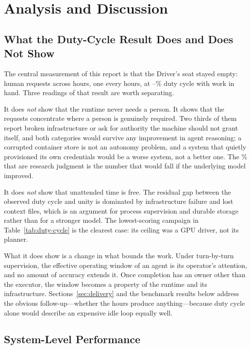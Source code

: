 \section{Analysis and Discussion}
\label{sec:discussion}

\subsection{What the Duty-Cycle Result Does and Does Not Show}

The central measurement of this report is that the Driver's seat stayed empty:
\DutyInterruptions{} human requests across \DutyWallHours{} hours, one every
\DutyInterval{} hours, at \DutyCycleLow--\DutyCycleHigh\% duty cycle with work in
hand. Three readings of that result are worth separating.

It does \emph{not} show that the runtime never needs a person. It shows that the
requests concentrate where a person is genuinely required. Two thirds of them report
broken infrastructure or ask for authority the machine should not grant itself, and
both categories would survive any improvement in agent reasoning; a corrupted
container store is not an autonomy problem, and a system that quietly provisioned its
own credentials would be a worse system, not a better one. The
\DutyJudgmentPercent\% that are research judgment is the number that would fall if
the underlying model improved.

It does \emph{not} show that unattended time is free. The residual gap between the
observed duty cycle and unity is dominated by infrastructure failure and lost context
files, which is an argument for process supervision and durable storage rather than
for a stronger model. The lowest-scoring campaign in
Table~\ref{tab:duty-cycle} is the clearest case: its ceiling was a GPU driver, not
its planner.

What it does show is a change in what bounds the work. Under turn-by-turn
supervision, the effective operating window of an agent is its operator's attention,
and no amount of accuracy extends it. Once completion has an owner other than the
executor, the window becomes a property of the runtime and its infrastructure.
Sections~\ref{sec:delivery} and the benchmark results below address the obvious
follow-up---whether the hours produce anything---because duty cycle alone would
describe an expensive idle loop equally well.

\subsection{System-Level Performance}

